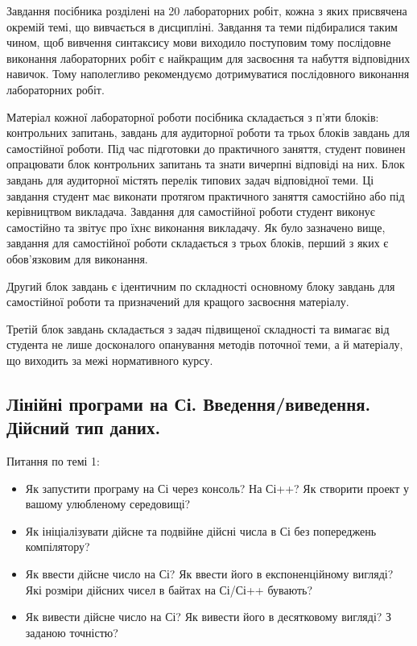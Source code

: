 \documentclass[]{article}
\begin{document}
Завдання посібника розділені на 20 лабораторних робіт, кожна з яких
присвячена окремій темі, що вивчається в дисципліні. Завдання та теми
підбиралися таким чином, щоб вивчення синтаксису мови виходило
поступовим тому послідовне виконання лабораторних робіт є найкращим для
засвоєння та набуття відповідних навичок. Тому наполегливо рекомендуємо
дотримуватися послідовного виконання лабораторних робіт.

Матеріал кожної лабораторної роботи посібника складається з п'яти
блоків: контрольних запитань, завдань для аудиторної роботи та трьох
блоків завдань для самостійної роботи. Під час підготовки до практичного
заняття, студент повинен опрацювати блок контрольних запитань та знати
вичерпні відповіді на них. Блок завдань для аудиторної містять перелік
типових задач відповідної теми. Ці завдання студент має виконати
протягом практичного заняття самостійно або під керівництвом викладача.
Завдання для самостійної роботи студент виконує самостійно та звітує про
їхнє виконання викладачу. Як було зазначено вище, завдання для
самостійної роботи складається з трьох блоків, перший з яких є
обов'язковим для виконання.

Другий блок завдань є ідентичним по складності основному блоку завдань
для самостійної роботи та призначений для кращого засвоєння матеріалу.

Третій блок завдань складається з задач підвищеної складності та вимагає
від студента не лише досконалого опанування методів поточної теми, а й
матеріалу, що виходить за межі нормативного курсу.

\newpage
\subsection{ Лінійні програми на Сі. Введення/виведення. Дійсний тип даних. }
\setcounter{subsection}{1}

Питання по темі 1:

\begin{itemize}
\item
Як запустити програму на Сі через консоль? На Сі++? Як створити
проект у вашому улюбленому середовищі?
\item
Як ініціалізувати дійсне та подвійне дійсні числа в Сі без попереджень 
компілятору? 
\item
Як ввести дійсне число на Сі? Як ввести його в
експоненційному вигляді? Які розміри дійсних чисел в байтах на Сі/Сі++
бувають?

\item
Як вивести дійсне число на Сі? Як вивести його в десятковому вигляді?
З заданою точністю?
\end{itemize}
\end{document}
